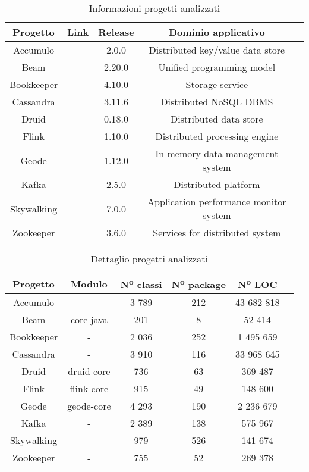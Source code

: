 \begin{table}[h]
    \centering
    \begin{tabular}{|c|c|c|c|c|}
        \hline
        \textbf{Progetto} & \textbf{Link} & \textbf{Release} & \textbf{Dominio applicativo}  \\
        \hline
        Accumulo & \cite{accumulogithub} & 2.0.0 & Distributed key/value data store  \\
        Beam & \cite{beamgithub} & 2.20.0 & Unified programming model  \\
        Bookkeeper & \cite{bookkeepergithub} & 4.10.0 & Storage service  \\
        Cassandra & \cite{cassandragithub} & 3.11.6 & Distributed NoSQL DBMS  \\
        Druid & \cite{druidgithub} & 0.18.0 & Distributed data store  \\
        Flink & \cite{flinkgithub} & 1.10.0 & Distributed processing engine  \\
        Geode & \cite{geodegithub} & 1.12.0 & In-memory data management system  \\
        Kafka & \cite{kafkagithub} & 2.5.0 & Distributed platform  \\
        Skywalking & \cite{skywalkinggithub} & 7.0.0 & Application performance monitor system  \\
        Zookeeper & \cite{zookeepergithub} & 3.6.0 & Services for distributed system  \\
        \hline
    \end{tabular}
    \caption{Informazioni progetti analizzati}
    \label{tab:caption}
\end{table}
\begin{table}[h]
    \centering
    \begin{tabular}{|c|c|c|c|c|c|}
        \hline
        \textbf{Progetto} & \textbf{Modulo} & \textbf{N\textsuperscript{o} classi} & \textbf{N\textsuperscript{o} package} & \textbf{N\textsuperscript{o} LOC}  \\
        \hline
        Accumulo & - & 3 789 & 212 & 43 682 818 \\
        Beam & core-java & 201 & 8 & 52 414 \\
        Bookkeeper & - & 2 036 & 252 & 1 495 659 \\
        Cassandra & - & 3 910 & 116 & 33 968 645 \\
        Druid & druid-core & 736 & 63 & 369 487 \\
        Flink & flink-core & 915 & 49 & 148 600 \\
        Geode & geode-core & 4 293 & 190 & 2 236 679\\
        Kafka & - & 2 389 & 138 & 575 967 \\
        Skywalking & - & 979 & 526 & 141 674 \\
        Zookeeper & - & 755 & 52 & 269 378 \\
        \hline
    \end{tabular}
    \caption{Dettaglio progetti analizzati}
    \label{tab:caption}
\end{table}